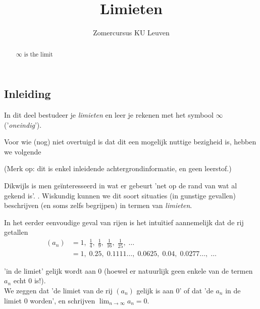 \documentclass[numbers]{ximera}
\author{Zomercursus KU Leuven}
\title{Limieten}
\begin{document}
\begin{abstract}
	$\infty$ is the limit
\end{abstract}
\maketitle

\subsection{Inleiding}
In dit deel bestudeer je \textit{limieten} en leer je rekenen met het symbool $\infty$ ('\textit{oneindig}').

\begin{expandable}
Voor wie (nog) niet overtuigd is dat dit een mogelijk nuttige bezigheid is, hebben we volgende%


\begin{tcolorbox}[title=Uitwijding: achtergrondinformatie over het hoe en waarom van limieten]
	\footnotesize
(Merk op: dit is enkel inleidende achtergrondinformatie, en geen leerstof.)	

Dikwijls is men geïnteresseerd in wat er gebeurt 'net op de rand van wat al gekend is'. . Wiskundig kunnen we dit soort situaties (in gunstige gevallen) beschrijven (en soms zelfs begrijpen) in termen van \textit{limieten}. 

In het eerder eenvoudige geval van rijen is het intuïtief aannemelijk dat de rij getallen
\begin{align*}
(a_n) & = 1, \;\frac{1}{4}, \;\frac{1}{9}, \;\frac{1}{16},\;\frac{1}{25},\;\dots\\
                                & =1,\; 0.25,\;  0.1111\dots,\; 0.0625,\; 0.04,\; 0.0277\dots,\; \dots
\end{align*}

'in de limiet' gelijk wordt aan $0$ (hoewel er natuurlijk geen enkele van de termen $a_n$ echt $0$ is!). \\
We zeggen dat 'de limiet van de rij $(a_n)$ gelijk is aan $0$' of dat 'de $a_n$ in de limiet $0$ worden', en schrijven $\lim_{n\to\infty}a_n = 0$.


\end{tcolorbox}
\end{expandable}
\end{document}
